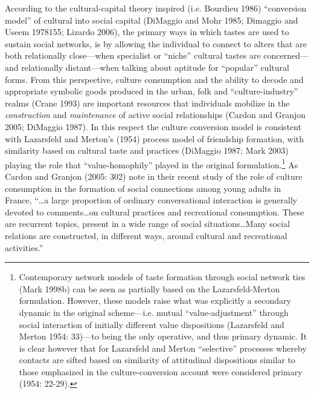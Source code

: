 \documentclass[
]{article}
\begin{document}
According to the cultural-capital theory inspired (i.e. Bourdieu 1986) ``conversion model'' of cultural into social capital (DiMaggio and Mohr 1985; Dimaggio and Useem 1978155; Lizardo 2006), the primary ways in which tastes are used to sustain social networks, is by allowing the individual to connect to alters that are both relationally close---when specialist or ``niche'' cultural tastes are concerned---and relationally distant---when talking about aptitude for ``popular'' cultural forms. From this perspective, culture consumption and the ability to decode and appropriate symbolic goods produced in the urban, folk and ``culture-industry'' realms (Crane 1993) are important resources that individuals mobilize in the \emph{construction} and \emph{maintenance} of active social relationships (Cardon and Granjon 2005; DiMaggio 1987). In this respect the culture conversion model is consistent with Lazarsfeld and Merton's (1954) process model of friendship formation, with similarity based on cultural taste and practices (DiMaggio 1987; Mark 2003) playing the role that ``value-homophily'' played in the original formulation.\footnote{Contemporary network models of taste formation through social network ties (Mark 1998b) can be seen as partially based on the Lazarsfeld-Merton formulation. However, these models raise what was explicitly a secondary dynamic in the original scheme---i.e. mutual ``value-adjustment'' through social interaction of initially different value dispositions (Lazarsfeld and Merton 1954: 33)---to being the only operative, and thus primary dynamic. It is clear however that for Lazarsfeld and Merton ``selective'' processes whereby contacts are sifted based on similarity of attitudinal dispositions similar to those emphasized in the culture-conversion account were considered primary (1954: 22-29).} As Cardon and Granjon (2005: 302) note in their recent study of the role of culture consumption in the formation of social connections among young adults in France, ``\ldots a large proportion of ordinary conversational interaction is generally devoted to comments\ldots on cultural practices and recreational consumption. These are recurrent topics, present in a wide range of social situations\ldots Many social relations are constructed, in different ways, around cultural and recreational activities.''
\end{document}
